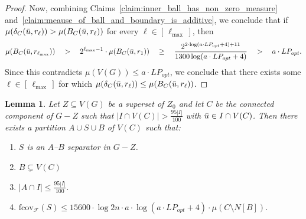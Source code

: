 \documentclass[11pt]{amsart}
\newtheorem{lemma}[theorem]{Lemma}
\newcommand{\lpopt}{LP_{opt}}
\begin{document}
\begin{proof}
    Now, combining Claims~\ref{claim:inner_ball_has_non_zero_measure} and~\ref{claim:meause_of_ball_and_boundary_is_additive}, we conclude that if $\mu(\delta_C(\Bar{u}, r_\ell)) > \mu(B_C(\Bar{u}, r_\ell))$ for every $\ell \in [\,\ell_{\max}\,]$, then 
    $$
    \mu(B_C(\Bar{u}, r_{\ell_{\max}})) \quad
    > \quad 2^{\ell_{\max} - 1} \cdot \mu(B_C(\Bar{u}, r_1)) \quad
    \geq \quad \frac{2^{2 \cdot \log(a \cdot \lpopt + 4) + 11} }{1300\log(a \cdot \lpopt + 4)} \quad
    > \quad a \cdot\lpopt.
    $$
    Since this contradicts $\mu(V(G)) \leq a \cdot\lpopt$, we conclude that there exists some $\ell \in [\,\ell_{\max}\,]$ for which $\mu(\delta_C(\Bar{u}, r_\ell)) \leq \mu(B_C(\Bar{u}, r_\ell))$.
\end{proof}


\begin{lemma}\label{lem:cutoff_procedure}
     Let $Z \subseteq V(G)$ be a superset of $Z_0$ and let $C$ be the connected component of $G - Z$ such that $|I\cap V(C)| > \frac{95|I|}{100}$ with $\Bar{u} \in I \cap V(C)$. Then there exists a partition $A\cup S\cup B$ of $V(C)$ such that:
    \begin{enumerate}
        \item $S$ is an $A$--$B$ separator in $G-Z$.
        \item $B \subsetneq V(C)$
        \item $|A \cap I| \leq \frac{95|I|}{100}$.
        \item $\mathrm{fcov}_{\mathcal{F}}(S) \leq 15600 \cdot \log 2n \cdot a \cdot \log(a \cdot \lpopt + 4) \cdot \mu(C\setminus N[B])$.
    \end{enumerate}
\end{lemma}
\end{document}
